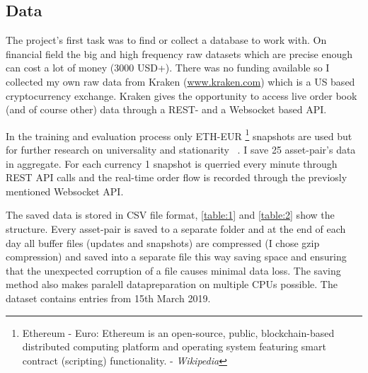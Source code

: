 \documentclass[11pt,a4paper,oneside]{article}
\begin{document}
\subsection{Data}
\label{sec:data}

The project's first task was to find or collect a database to work with. On financial field the big and high frequency 
raw datasets which are precise enough can cost a lot of money (3000 USD+). There was no funding available so I collected 
my own raw data from Kraken (\url{www.kraken.com}) which is a US based cryptocurrency exchange. Kraken gives the 
opportunity to access live order book (and of course other) data through a REST- and a Websocket based API. 

In the training and evaluation process only ETH-EUR \footnote{Ethereum - Euro: Ethereum is an open-source, public, 
blockchain-based distributed computing platform and operating system featuring smart contract (scripting) functionality. 
- \textit{Wikipedia} } snapshots are used but for further research on universality and stationarity ~\cite{univ}. I save 
25 asset-pair's data in aggregate. For each currency 1 snapshot is querried every minute through REST API calls and the 
real-time order flow is recorded through the previosly mentioned Websocket API.  

The saved data is stored in CSV file format, \autoref{table:1} and \autoref{table:2} show the structure. Every 
asset-pair is saved to a separate folder and at the end of each day all buffer files (updates and snapshots) are 
compressed (I chose gzip compression) and saved into a separate file this way saving space and ensuring that the 
unexpected corruption of a file causes minimal data loss. The saving method also makes paralell datapreparation on 
multiple CPUs possible. The dataset contains entries from 15th March 2019.
\end{document}
